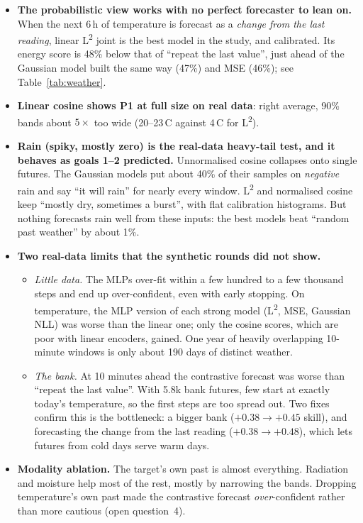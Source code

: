 \documentclass[11pt]{article}
\newcommand{\Ltwo}{L\textsuperscript{2}}
\begin{document}
\begin{itemize}
\item \textbf{The probabilistic view works with no perfect forecaster to lean on.} When
  the next 6\,h of temperature is forecast as a \emph{change from the last reading},
  linear \Ltwo{} joint is the best model in the study, and calibrated. Its energy score is
  48\% below that of ``repeat the last value'', just ahead of the Gaussian model built the
  same way (47\%) and MSE (46\%); see Table~\ref{tab:weather}.
\item \textbf{Linear cosine shows P1 at full size on real data}: right average, 90\% bands
  about $5\times$ too wide (20--23\,\textdegree C against 4\,\textdegree C for \Ltwo).
\item \textbf{Rain (spiky, mostly zero) is the real-data heavy-tail test, and it behaves as
  goals 1--2 predicted.} Unnormalised cosine collapses onto single futures. The Gaussian
  models put about 40\% of their samples on \emph{negative} rain and say ``it will rain''
  for nearly every window. \Ltwo{} and normalised cosine keep ``mostly dry, sometimes a
  burst'', with flat calibration histograms. But nothing forecasts rain well from these
  inputs: the best models beat ``random past weather'' by about 1\%.
\item \textbf{Two real-data limits that the synthetic rounds did not show.}
  \begin{itemize}
  \item \emph{Little data.} The MLPs over-fit within a few hundred to a few thousand steps
    and end up over-confident, even with early stopping. On temperature, the MLP version
    of each strong model (\Ltwo, MSE, Gaussian NLL) was worse than the linear one; only the
    cosine scores, which are poor with linear encoders, gained. One year of heavily overlapping 10-minute windows is only about 190
    days of distinct weather.
  \item \emph{The bank.} At 10 minutes ahead the contrastive forecast was worse than
    ``repeat the last value''. With 5.8k bank futures, few start at exactly today's
    temperature, so the first steps are too spread out. Two fixes confirm this is the
    bottleneck: a bigger bank ($+0.38 \to +0.45$ skill), and forecasting the change from
    the last reading ($+0.38 \to +0.48$), which lets futures from cold days serve warm days.
  \end{itemize}
\item \textbf{Modality ablation.} The target's own past is almost everything. Radiation and
  moisture help most of the rest, mostly by narrowing the bands. Dropping temperature's own
  past made the contrastive forecast \emph{over}-confident rather than more cautious (open
  question~4).
\end{itemize}
\end{document}
